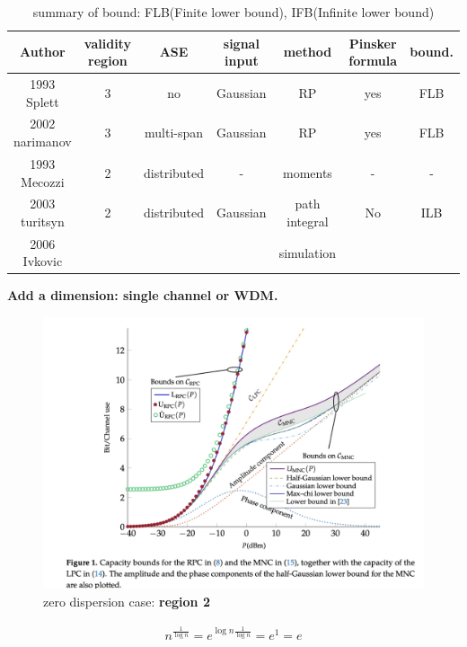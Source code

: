  \begin{table}[ht]
		\centering
		\begin{tabular}{|c|c|c|c|c|c|c|}\hline
			Author & validity region & ASE & signal input & method & Pinsker formula & bound. \\
			\hline
			1993 Splett\cite{splett1993} & 3 & no & Gaussian & RP & yes & FLB \\
			\hline
			2002 narimanov\cite{narimanov2002} & 3 & multi-span & Gaussian & RP & yes & FLB \\
			\hline
			1993 Mecozzi\cite{1993Mecozzi} & 2 & distributed & - & moments & - & - \\
			\hline
			2003 turitsyn\cite{2003turitsyn} & 2 & distributed & Gaussian & path integral & No & ILB \\
			\hline
			2006 Ivkovic\cite{2006Ivkovic} &   &  &  & simulation &  &  \\
			\hline

		\end{tabular}
		\caption{summary of bound: FLB(Finite lower bound), IFB(Infinite lower bound)}
		\label{summary}
\end{table}
\textbf{Add a dimension: single channel or WDM.}

\begin{figure}
\centering
\includegraphics[width=0.8\linewidth]{img/zeros_disp_plot.png}
\caption{zero dispersion case: \textbf{region 2}}
\label{region 2}
\end{figure}

\begin{align*}
n^{\frac{1}{\log n}} = e^{\log n \frac{1}{\log n}} = e^{1} = e
\end{align*}
